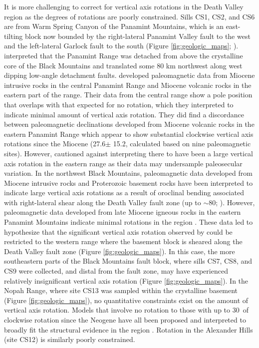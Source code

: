 It is more challenging to correct for vertical axis rotations in the Death Valley region as the degrees of rotations are poorly constrained. Sills CS1, CS2, and CS6 are from Warm Spring Canyon of the Panamint Mountains, which is an east-tilting block now bounded by the right-lateral Panamint Valley fault to the west and the left-lateral Garlock fault to the south (Figure \ref{fig:geologic_maps}; ).  interpreted that the Panamint Range was detached from above the crystalline core of the Black Mountains and translated some 80 km northwest along west dipping low-angle detachment faults.  developed paleomagnetic data from Miocene intrusive rocks in the central Panamint Range and Miocene volcanic rocks in the eastern part of the range. Their data from the central range show a pole position that overlaps with that expected for no rotation, which they interpreted to indicate minimal amount of vertical axis rotation. They did find a discordance between paleomagnetic declinations developed from Miocene volcanic rocks in the eastern Panamint Range which appear to show substantial clockwise vertical axis rotations since the Miocene (27.6\textdegree $\pm$ 15.2\textdegree, calculated based on nine paleomagnetic sites). However,  cautioned against interpreting there to have been a large vertical axis rotation in the eastern range as their data may undersample paleosecular variation. In the northwest Black Mountains, paleomagnetic data developed from Miocene intrusive rocks and Proterozoic basement rocks have been interpreted to indicate large vertical axis rotations as a result of oroclinal bending associated with right-lateral shear along the Death Valley fault zone (up to $\sim$80\textdegree; ). However, paleomagnetic data developed from late Miocene igneous rocks in the eastern Panamint Mountains indicate minimal rotations in the region \cite{Petronis2002a}. These data led  to hypothesize that the significant vertical axis rotation observed by  could be restricted to the western range where the basement block is sheared along the Death Valley fault zone (Figure \ref{fig:geologic_maps}). In this case, the more southeastern parts of the Black Mountains fault block, where sills CS7, CS8, and CS9 were collected, and distal from the fault zone, may have experienced relatively insignificant vertical axis rotation (Figure \ref{fig:geologic_maps}). In the Nopah Range, where site CS13 was sampled within the crystalline basement (Figure \ref{fig:geologic_maps}), no quantitative constraints exist on the amount of vertical axis rotation. Models that involve no rotation to those with up to 30\textdegree\ of clockwise rotation since the Neogene have all been proposed and interpreted to broadly fit the structural evidence in the region \cite[e.g.][]{Serpa1996a, Pavlis2014a}. Rotation in the Alexander Hills (site CS12) is similarly poorly constrained. 


